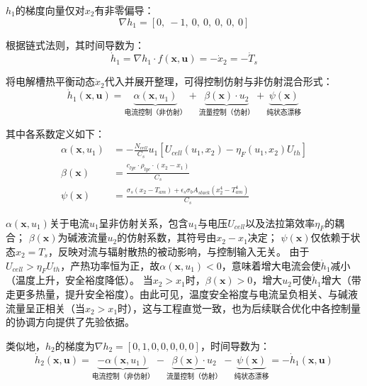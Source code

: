 $h_1$的梯度向量仅对$x_2$有非零偏导：
\begin{equation}
  \nabla h_1 = \left[ 0,\ -1,\ 0,\ 0,\ 0,\ 0,\ 0 \right]
\end{equation}

根据链式法则，其时间导数为：
\begin{equation}
  \dot{h}_1 = \nabla h_1 \cdot f(\mathbf{x}, \mathbf{u}) = -\dot{x}_2 = -\dot{T}_s
\end{equation}

将电解槽热平衡动态$\dot{x}_2$代入并展开整理，可得控制仿射与非仿射混合形式：
\begin{equation}
  \dot{h}_1(\mathbf{x}, \mathbf{u}) = \underbrace{\alpha(\mathbf{x}, u_1)}_{\text{电流控制（非仿射）}} + \underbrace{\beta(\mathbf{x}) \cdot u_2}_{\text{流量控制（仿射）}} + \underbrace{\psi(\mathbf{x})}_{\text{纯状态漂移}}
  \label{eq:h1_dot}
\end{equation}

其中各系数定义如下：
\begin{align}
  \alpha(\mathbf{x}, u_1) &= -\frac{N_{cell}}{C_s} u_1 \left[ U_{cell}(u_1, x_2) - \eta_F(u_1, x_2) U_{th} \right] \\
  \beta(\mathbf{x}) &= \frac{c_{lye} \cdot \rho_{lye} \cdot (x_2 - x_1)}{C_s} \\
  \psi(\mathbf{x}) &= \frac{\sigma_s(x_2 - T_{am}) + \epsilon_s \sigma_b A_{stack}(x_2^4 - T_{am}^4)}{C_s}
\end{align}

$\alpha(\mathbf{x}, u_1)$关于电流$u_1$呈非仿射关系，包含$u_1$与电压$U_{cell}$以及法拉第效率$\eta_F$的耦合；
$\beta(\mathbf{x})$为碱液流量$u_2$的仿射系数，其符号由$x_2 - x_1$决定；
$\psi(\mathbf{x})$仅依赖于状态$x_2 = T_s$，反映对流与辐射散热的被动影响，与控制输入无关。
由于$U_{cell} > \eta_F U_{th}$，产热功率恒为正，故$\alpha(\mathbf{x}, u_1) < 0$，意味着增大电流会使$\dot{h}_1$减小（温度上升，安全裕度降低）。
当$x_2 > x_1$时，$\beta(\mathbf{x}) > 0$，增大$u_2$可使$\dot{h}_1$增大（带走更多热量，提升安全裕度）。由此可见，温度安全裕度与电流呈负相关、与碱液流量呈正相关（当$x_2 > x_1$时），这与工程直觉一致，也为后续联合优化中各控制量的协调方向提供了先验依据。

类似地，$h_2$的梯度为$\nabla h_2 = [0, 1, 0, 0, 0, 0, 0]$，时间导数为：
\begin{equation}
  \dot{h}_2(\mathbf{x}, \mathbf{u}) = \underbrace{-\alpha(\mathbf{x}, u_1)}_{\text{电流控制（非仿射）}} - \underbrace{\beta(\mathbf{x}) \cdot u_2}_{\text{流量控制（仿射）}} - \underbrace{\psi(\mathbf{x})}_{\text{纯状态漂移}} = -\dot{h}_1(\mathbf{x}, \mathbf{u})
  \label{eq:h2_dot}
\end{equation}

